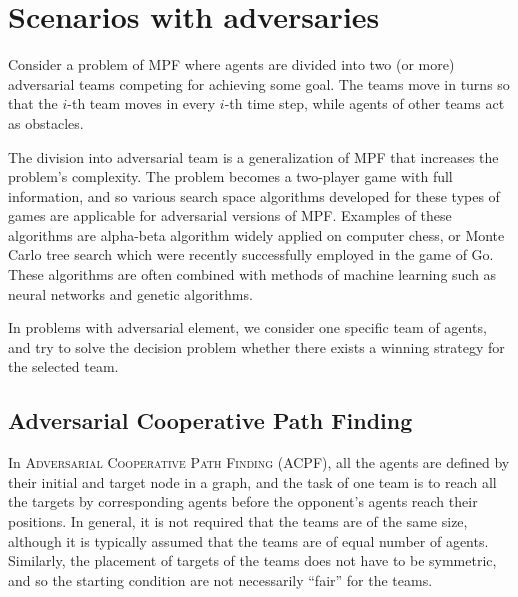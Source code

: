 \section{Scenarios with adversaries}

Consider a problem of MPF where agents are divided into two (or more) adversarial teams competing for achieving some goal.
The teams move in turns so that the $i$-th team moves in every $i$-th time step, while agents of other teams act as obstacles.

The division into adversarial team is a generalization of MPF that increases the problem's complexity.
The problem becomes a two-player game with full information, and so various search space algorithms developed for these types of games are applicable for adversarial versions of MPF.
Examples of these algorithms are alpha-beta algorithm widely applied on computer chess, or Monte Carlo tree search which were recently successfully employed in the game of Go.
These algorithms are often combined with methods of machine learning such as neural networks and genetic algorithms.

In problems with adversarial element, we consider one specific team of agents, and try to solve the decision problem whether there exists a winning strategy for the selected team. 

\subsection{Adversarial Cooperative Path Finding}

In \textsc{Adversarial Cooperative Path Finding} (ACPF), all the agents are defined by their initial and target node in a graph, 
and the task of one team is to reach all the targets by corresponding agents before the opponent's agents reach their positions.
In general, it is not required that the teams are of the same size, although it is typically assumed that the teams are of equal number of agents.
Similarly, the placement of targets of the teams does not have to be symmetric, and so the starting condition are not necessarily ``fair'' for the teams.

